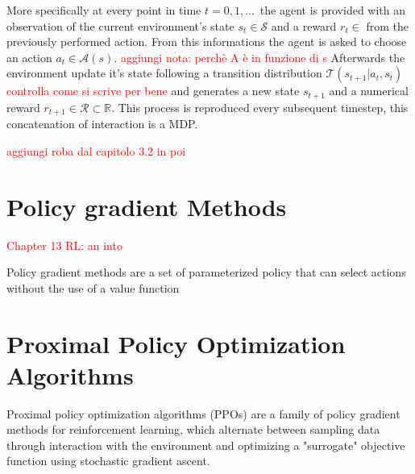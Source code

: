 More specifically at every point in time \( t = 0,1,...\, \) the agent is provided with an observation of the current environment's state \( s_t \in \mathcal{S} \) and a reward \( r_t \in \) from the previously performed action. From this informations the agent is asked to choose an action \( a_t \in \mathcal{A}(s) \). \textcolor{red}{aggiungi nota: perchè A è in funzione di s} Afterwards the environment update it's state following a transition distribution \( \mathcal{T}(s_{t+1}|a_t,s_t) \)\textcolor{red}{controlla come si scrive per bene} and generates a new state \( s_{t+1} \) and a numerical reward \( r_{t+1} \in \mathcal{R} \subset \mathbb{R} \). This process is reproduced every subsequent timestep, this concatenation of interaction is a MDP.

\textcolor{red}{aggiungi roba dal capitolo 3.2 in poi}

\section{}

\section{Policy gradient Methods}  
\textcolor{red}{Chapter 13 RL: an into}


Policy gradient methods are a set of parameterized policy that can select actions without the use of a value function


\section{Proximal Policy Optimization Algorithms}


Proximal policy optimization algorithms (PPOs) are a family of policy gradient methods for reinforcement learning, which alternate between sampling data through interaction with the environment and optimizing a "surrogate" objective function using stochastic gradient ascent.
